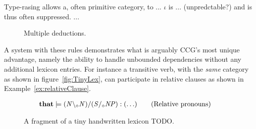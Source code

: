 Type-rasing allows a, often primitive category, to ... $\iota$ is ... (unpredctable?) and is thus often suppressed. ...  

\begin{figure}[ht]
\begin{minipage}[b]{0.5\linewidth}
\center
{}
\end{minipage}
\hfill
\begin{minipage}[b]{0.5\linewidth}
\center
{}
\end{minipage}
  \caption{Multiple deductions.}
  \label{fig:multipleDeductions}
\end{figure}

A system with these rules demonstrates what is arguably CCG's most unique advantage, namely the ability to handle unbounded dependencies without any additional lexicon entries. For instance a transitive verb, with the \emph{same} category as shown in figure~\ref{fig:TinyLex}, can participate in relative clauses as shown in Example~\ref{ex:relativeClause}.

\begin{figure}[ht]
\vspace{-1em}
\begin{align*}
  \mathbf{that}       &\models ({\mathit{N}} \backslash_\diamond {\mathit{N}})/({\mathit{S}}/_\diamond{\mathit{NP}})    : (\ldots)    \tag{Relative pronouns}   
\end{align*}
\vspace{-1em}
\caption{A fragment of a tiny handwritten lexicon TODO.}
\label{fig:TinyLex2}
\end{figure}


